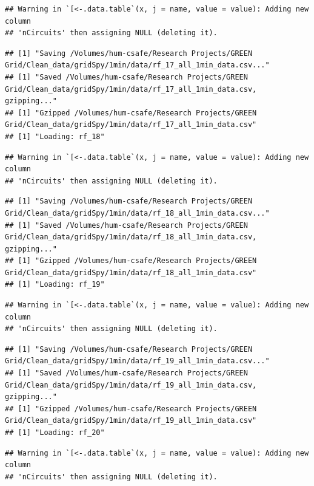 \documentclass[]{article}
\begin{document}
\begin{verbatim}
## Warning in `[<-.data.table`(x, j = name, value = value): Adding new column
## 'nCircuits' then assigning NULL (deleting it).
\end{verbatim}

\begin{verbatim}
## [1] "Saving /Volumes/hum-csafe/Research Projects/GREEN Grid/Clean_data/gridSpy/1min/data/rf_17_all_1min_data.csv..."
## [1] "Saved /Volumes/hum-csafe/Research Projects/GREEN Grid/Clean_data/gridSpy/1min/data/rf_17_all_1min_data.csv, gzipping..."
## [1] "Gzipped /Volumes/hum-csafe/Research Projects/GREEN Grid/Clean_data/gridSpy/1min/data/rf_17_all_1min_data.csv"
## [1] "Loading: rf_18"
\end{verbatim}

\begin{verbatim}
## Warning in `[<-.data.table`(x, j = name, value = value): Adding new column
## 'nCircuits' then assigning NULL (deleting it).
\end{verbatim}

\begin{verbatim}
## [1] "Saving /Volumes/hum-csafe/Research Projects/GREEN Grid/Clean_data/gridSpy/1min/data/rf_18_all_1min_data.csv..."
## [1] "Saved /Volumes/hum-csafe/Research Projects/GREEN Grid/Clean_data/gridSpy/1min/data/rf_18_all_1min_data.csv, gzipping..."
## [1] "Gzipped /Volumes/hum-csafe/Research Projects/GREEN Grid/Clean_data/gridSpy/1min/data/rf_18_all_1min_data.csv"
## [1] "Loading: rf_19"
\end{verbatim}

\begin{verbatim}
## Warning in `[<-.data.table`(x, j = name, value = value): Adding new column
## 'nCircuits' then assigning NULL (deleting it).
\end{verbatim}

\begin{verbatim}
## [1] "Saving /Volumes/hum-csafe/Research Projects/GREEN Grid/Clean_data/gridSpy/1min/data/rf_19_all_1min_data.csv..."
## [1] "Saved /Volumes/hum-csafe/Research Projects/GREEN Grid/Clean_data/gridSpy/1min/data/rf_19_all_1min_data.csv, gzipping..."
## [1] "Gzipped /Volumes/hum-csafe/Research Projects/GREEN Grid/Clean_data/gridSpy/1min/data/rf_19_all_1min_data.csv"
## [1] "Loading: rf_20"
\end{verbatim}

\begin{verbatim}
## Warning in `[<-.data.table`(x, j = name, value = value): Adding new column
## 'nCircuits' then assigning NULL (deleting it).
\end{verbatim}
\end{document}
